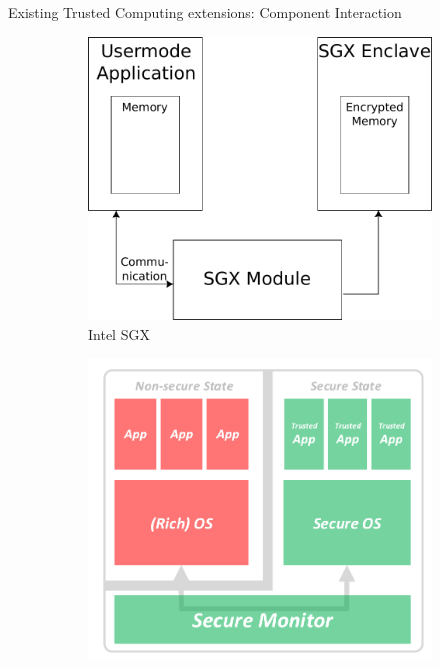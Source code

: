\documentclass[aspectratio=169]{beamer}
\begin{document}
\begin{frame}{Existing Trusted Computing extensions: Component Interaction}
    \begin{figure}
        \begin{subfigure}[]{0.23\textwidth}
            \includegraphics[width=\textwidth]{images/sgx_components.pdf}
            \caption{Intel SGX}
        \end{subfigure}
        \begin{subfigure}[]{0.23\textwidth}
            \includegraphics[width=\textwidth]{images/trustzone.png}

\end{subfigure}
\end{figure}
\end{frame}
\end{document}
